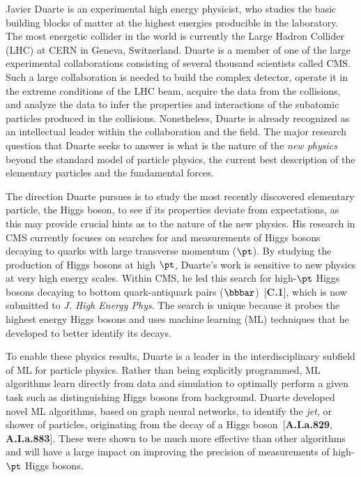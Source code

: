 \documentclass[11pt]{article}
\begin{document}
Javier Duarte is an experimental high energy physicist, who studies the basic building blocks of matter at the highest energies producible in the laboratory.
The most energetic collider in the world is currently the Large Hadron Collider (LHC) at CERN in Geneva, Switzerland.
Duarte is a member of one of the large experimental collaborations consisting of several thousand scientists called CMS.
Such a large collaboration is needed to build the complex detector, operate it in the extreme conditions of the LHC beam, acquire the data from the collisions, and analyze the data to infer the properties and interactions of the subatomic particles produced in the collisions.
Nonetheless, Duarte is already recognized as an intellectual leader within the collaboration and the field.
The major research question that Duarte seeks to answer is what is the nature of the \emph{new physics} beyond the standard model of particle physics, the current best description of the elementary particles and the fundamental forces.

The direction Duarte pursues is to study the most recently discovered elementary particle, the Higgs boson, to see if its properties deviate from expectations, as this may provide crucial hints as to the nature of the new physics.
His research in CMS currently focuses on searches for and measurements of Higgs bosons decaying to quarks with large transverse momentum ($\pt$).
By studying the production of Higgs bosons at high $\pt$, Duarte's work is sensitive to new physics at very high energy scales.
Within CMS, he led this search for high-$\pt$ Higgs bosons decaying to bottom quark-antiquark pairs ($\bbbar$)~[\textbf{C.1}], which is now submitted to \emph{J. High Energy Phys}.
The search is unique because it probes the highest energy Higgs bosons and uses machine learning (ML) techniques that he developed to better identify its decays.

To enable these physics results, Duarte is a leader in the interdisciplinary subfield of ML for particle physics.
Rather than being explicitly programmed, ML algorithms learn directly from data and simulation to optimally perform a given task such as distinguishing Higgs bosons from background.
Duarte developed novel ML algorithms, based on graph neural networks, to identify the \emph{jet}, or shower of particles, originating from the decay of a Higgs boson~[\textbf{A.I.a.829}, \textbf{A.I.a.883}].
These were shown to be much more effective than other algorithms and will have a large impact on improving the precision of measurements of high-$\pt$ Higgs bosons.
\end{document}
